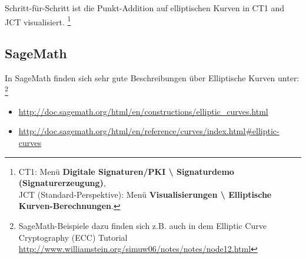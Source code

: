 \begin{refsegment}
Schritt-für-Schritt ist die Punkt-Addition auf elliptischen Kurven
in CT1 and JCT visualisiert.%
\footnote{%
  CT1: Menü {\bf Digitale Signaturen/PKI \textbackslash{} Signaturdemo
  (Signaturerzeugung)},\\
  JCT (Standard-Perspektive): Menü {\bf Visualisierungen \textbackslash{}
  Elliptische Kurven-Berechnungen}.

}


\subsection{SageMath}
\label{ec:Sage_Massierer}

In SageMath finden sich sehr gute Beschreibungen über Elliptische Kurven unter:%
\footnote{%
SageMath-Beispiele dazu finden sich z.B. auch in
%
  dem \glqq Elliptic Curve Cryptography (ECC) Tutorial\grqq\\
  \url{http://www.williamstein.org/simuw06/notes/notes/node12.html}

}

\begin{sloppypar} %
\begin{itemize}
    \item \url{http://doc.sagemath.org/html/en/constructions/elliptic_curves.html}
    \item \url{http://doc.sagemath.org/html/en/reference/curves/index.html#elliptic-curves}
\end{itemize}
\end{sloppypar}



\end{refsegment}
